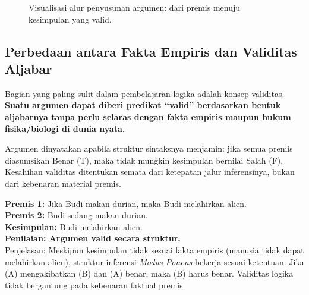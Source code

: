 \begin{figure}[H]
\centering
{}
\caption{Visualisasi alur penyusunan argumen: dari premis menuju kesimpulan yang valid.}
\label{fig:struktur-argumen}
\end{figure}

\subsection{Perbedaan antara Fakta Empiris dan Validitas Aljabar}

Bagian yang paling sulit dalam pembelajaran logika adalah konsep validitas. \textbf{Suatu argumen dapat diberi predikat ``valid'' berdasarkan bentuk aljabarnya tanpa perlu selaras dengan fakta empiris maupun hukum fisika/biologi di dunia nyata.} \cite{forallx,copi2014}

\begin{definisi}
Argumen dinyatakan  apabila struktur sintaksnya menjamin: jika semua premis diasumsikan Benar (T), maka tidak mungkin kesimpulan bernilai Salah (F). Kesahihan validitas ditentukan semata dari ketepatan jalur inferensinya, bukan dari kebenaran material premis.
\end{definisi}

\begin{contoh}
\textbf{Premis 1:} Jika Budi makan durian, maka Budi melahirkan alien. \\
\textbf{Premis 2:} Budi sedang makan durian. \\
\textbf{Kesimpulan:} Budi melahirkan alien. \\
\textbf{Penilaian: Argumen valid secara struktur.} \\
Penjelasan: Meskipun kesimpulan tidak sesuai fakta empiris (manusia tidak dapat melahirkan alien), struktur inferensi \textit{Modus Ponens} bekerja sesuai ketentuan. Jika (A) mengakibatkan (B) dan (A) benar, maka (B) harus benar. Validitas logika tidak bergantung pada kebenaran faktual premis.
\end{contoh}

